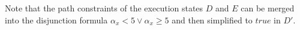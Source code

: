 {%
Note that the path constraints of the execution states $D$ and $E$ can be merged into the disjunction formula $\alpha_x < 5 \vee \alpha_x \geq 5$ and then simplified to $true$ in $D'$.
}









